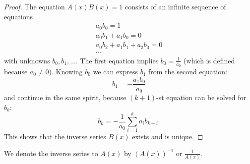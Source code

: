 

\setcounter{section}{2}
\setcounter{subsection}{2}
\setcounter{dfn}{3}

\begin{proof}
The equation $A(x)B(x) = 1$ consists of an infinite sequence of equations
\begin{gather*}
a_0b_0 = 1\\
a_0b_1 + a_1b_0 = 0\\
a_0b_2 + a_1b_1 + a_2b_0 = 0\\
\cdots
\end{gather*}
with unknowns $b_0, b_1, \ldots$.
The first equation implies $b_0 = \frac{1}{a_0}$ (which is defined because $a_0 \ne 0$).
Knowing $b_0$ we can express $b_1$ from the second equation:
\[
b_1 = -\frac{a_1b_0}{a_0}
\]
and continue in the same spirit, because $(k+1)$-st equation can be solved for $b_k$:
\[
b_k = -\frac{1}{a_0}\sum_{i=1}^k a_ib_{k-i}.
\]
This shows that the inverse series $B(x)$ exists and is unique.
\end{proof}

We denote the inverse series to $A(x)$ by $(A(x))^{-1}$ or $\frac{1}{A(x)}$.


